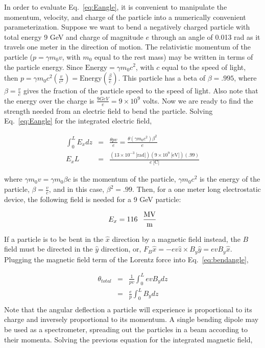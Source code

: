 \documentclass[12pt]{article}
\begin{document}
\begin{flushleft}
In order to evaluate Eq.~\ref{eq:Eangle}, it is convenient to manipulate the momentum, velocity, and charge of the particle into a numerically convenient parameterization.  Suppose we want to bend a negatively charged particle with total energy  9 GeV and charge of magnitude $e$ through an angle of 0.013 rad as it travels one meter in the direction of motion.  The relativistic momentum of the particle ($p=\gamma m_{0} v$, with $m_{0}$ equal to the rest mass)  may be written in terms of the particle energy.  Since  $\text{Energy}=\gamma m_{0} c^{2}$, with $c$ equal to the speed of light, then $p=\gamma m_{0} c^{2} \left( \frac{v}{c^{2}} \right) =\text{Energy} \left( \frac{\beta}{c} \right)$.  This particle has a beta of $\beta=.995$, where $\beta=\frac{v}{c}$ gives the fraction of the particle speed to the speed of light.  Also note that the  energy over the charge is $\frac{9GeV}{e}=9\times 10^{9}$ volts.  Now we are ready to find the strength needed from an electric field to bend the particle.  Solving Eq.~\ref{eq:Eangle} for the integrated electric field,

\begin{eqnarray*}
\int_{0}^{L} E_{x} dz & = & \frac{\theta p v}{e} = 
\frac{\theta (\gamma m_{0} c^{2}) \beta^{2}}{e}\\
E_{x}L & = & 
\frac{(13 \times 10^{-3}\:\mbox{[rad]})(9 \times 10^{9} \:\mbox{[eV]})(.99)}{e \:\text{[C]}}
\end{eqnarray*}

where $\gamma m_{0} v=\gamma m_{0} \beta c$ is the momentum of the particle, $\gamma m_{0} c^{2}$ is the energy of the particle, $\beta=\frac{v}{c}$, and in this case, $\beta^{2}=.99$.  Then, for a one meter long electrostatic device, the following field is needed for a 9 GeV particle:

\[
E_{x} = 116 \hspace{.1in} \frac{\mbox{MV}}{\mbox{m}}
\]


If a particle is to be bent in the $\hat{x}$ direction by a magnetic field instead, the $B$ field must be 
directed in the $\hat{y}$ direction, or, 
$F_{B}\hat{x}=-ev\hat{z} \times B_{y}\hat{y}=evB_{y}\hat{x}$.  Plugging the magnetic field term of the Lorentz force into Eq.~\ref{eq:bendangle},

\begin{eqnarray*}
\theta_{total} & = & \frac{1}{pv}\int_{0}^{L} ev B_{y} dz\\
               & = & \frac{e}{p}\int_{0}^{L} B_{y} dz\\
\end{eqnarray*}
Note that the angular deflection a particle will experience is proportional to its charge and inversely proportional to its momentum.  A single bending dipole may be used as a spectrometer, spreading out the particles in a beam according to their momenta.  Solving the previous equation for the integrated magnetic field,


\end{flushleft}
\end{document}
